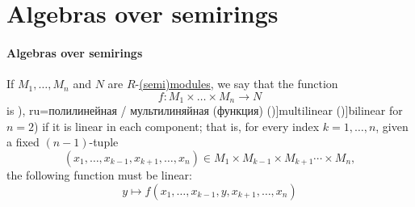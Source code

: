 \section{Algebras over semirings}\label{sec:algebras_over_semirings}

\paragraph{Algebras over semirings}

\begin{definition}\label{def:multilinear_function}
  If \( M_1, \ldots, M_n \) and \( N \) are \( R \)-\hyperref[def:semimodule]{(semi)modules}, we say that the function
  \begin{equation*}
    f: M_1 \times \ldots \times M_n \to N
  \end{equation*}
  is \term[bg=полилинейна (форма) (\cite[243]{ИлинСадовничиСендов1984АнализТом1}), ru=полилинейная / мультилиняйная (функция) (\cite[23]{Тыртышников2017ОсновыАлгебры})]{multilinear} (\term[en=билинейная (\cite[230]{Тыртышников2017ОсновыАлгебры})]{bilinear} for \( n = 2 \)) if it is linear in each component; that is, for every index \( k = 1, \ldots, n \), given a fixed \( (n - 1) \)-tuple
  \begin{equation*}
    (x_1, \ldots, x_{k-1}, x_{k+1}, \ldots, x_n) \in M_1 \times M_{k-1} \times M_{k+1} \cdots \times M_n,
  \end{equation*}
  the following function must be linear:
  \begin{equation*}
    y \mapsto f(x_1, \ldots, x_{k-1}, y, x_{k+1}, \ldots, x_n)
  \end{equation*}
\end{definition}

